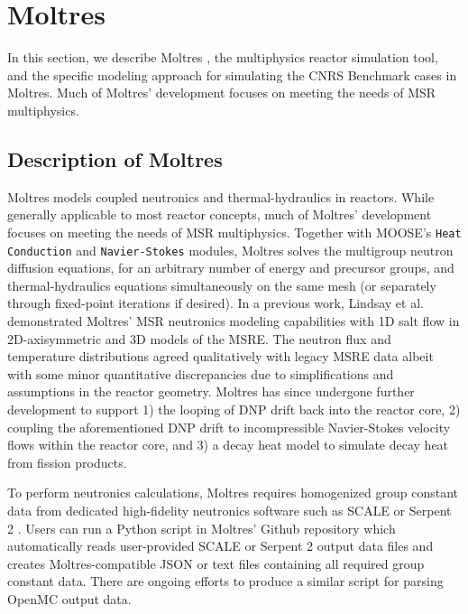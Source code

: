 \section{Moltres} \label{sec:moltres}

In this section, we describe Moltres \cite{lindsay_introduction_2018}, the
multiphysics reactor simulation tool, and the specific modeling approach for
simulating the CNRS Benchmark cases in Moltres. Much of Moltres' development
focuses on meeting the needs of \gls{MSR} multiphysics.

\subsection{Description of Moltres} \label{sec:description-of-moltres}

Moltres models coupled neutronics and thermal-hydraulics in reactors. While
generally applicable to most reactor concepts, much of
Moltres' development focuses on meeting the needs of \gls{MSR} multiphysics.
Together with \gls{MOOSE}'s \cite{permann_moose_2020} \texttt{Heat Conduction}
and \texttt{Navier-Stokes} \cite{peterson_overview_2018} modules, Moltres
solves the multigroup neutron diffusion
equations, for an arbitrary number of energy and precursor groups, and
thermal-hydraulics equations simultaneously on the same mesh (or separately
through fixed-point iterations if desired).
In a previous work, Lindsay et al. \cite{lindsay_introduction_2018}
demonstrated Moltres' \gls{MSR} neutronics modeling capabilities with 1D salt
flow in 2D-axisymmetric and 3D models of the \gls{MSRE}. The neutron flux and
temperature distributions agreed qualitatively with legacy
\gls{MSRE} data albeit with some minor quantitative discrepancies due to
simplifications and assumptions in the reactor geometry. Moltres has
since undergone further development to support 1) the looping of \gls{DNP}
drift back into the reactor core, 2) coupling the aforementioned \gls{DNP}
drift to incompressible Navier-Stokes velocity flows within the reactor core,
and 3) a decay heat model to simulate decay heat from fission products.

To perform neutronics calculations, Moltres requires homogenized group constant
data from dedicated high-fidelity neutronics software such as SCALE
\cite{dehart_reactor_2011} or Serpent 2 \cite{leppanen_serpent_2014}. Users
can run a Python script in Moltres' Github repository which automatically reads
user-provided SCALE or Serpent 2 output data files and creates
Moltres-compatible JSON or text files containing all required group constant
data. There are ongoing efforts to produce a similar script for parsing OpenMC
output data.

